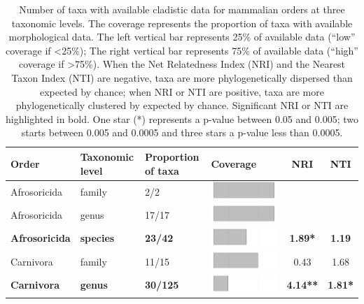 \begin{longtable}{lL{1.8cm}C{2cm}lcc}
\caption{Number of taxa with available cladistic data for mammalian orders at three taxonomic levels. The coverage represents the proportion of taxa with available morphological data. The left vertical bar represents 25\% of available data (``low'' coverage if \textless 25\%); The right vertical bar represents 75\% of available data (``high'' coverage if \textgreater 75\%). When the Net Relatedness Index (NRI) and the Nearest Taxon Index (NTI) are negative, taxa are more phylogenetically dispersed than expected by chance; when NRI or NTI are positive, taxa are more phylogenetically clustered by expected by chance. Significant NRI or NTI are highlighted in bold. One star (*) represents a p-value between 0.05 and 0.005; two starts between 0.005 and 0.0005 and three stars a p-value less than 0.0005.} \\ 
  \hline
Order & Taxonomic level & Proportion of taxa & Coverage & NRI & NTI \\ 
  \hline
Afrosoricida & family & 2/2 & \includegraphics[width=0.20\linewidth, height=0.05\linewidth]{Table_figures/bar1.pdf} &   &   \\ 
  Afrosoricida & genus & 17/17 & \includegraphics[width=0.20\linewidth, height=0.05\linewidth]{Table_figures/bar2.pdf} &   &   \\ 
  \textbf{Afrosoricida} & \textbf{species} & \textbf{23/42} & \includegraphics[width=0.20\linewidth, height=0.05\linewidth]{Table_figures/bar3.pdf} & \textbf{1.89*} & \textbf{1.19} \\ 
  Carnivora & family & 11/15 & \includegraphics[width=0.20\linewidth, height=0.05\linewidth]{Table_figures/bar4.pdf} & 0.43 & 1.68 \\ 
  \textbf{Carnivora} & \textbf{genus} & \textbf{30/125} & \includegraphics[width=0.20\linewidth, height=0.05\linewidth]{Table_figures/bar5.pdf} & \textbf{4.14**} & \textbf{1.81*} \\ 

\end{longtable}
